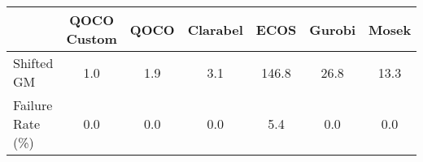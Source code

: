 \begin{tabular}{lcccccc}
  \hline
    & \textbf{QOCO Custom}   & \textbf{QOCO} & \textbf{Clarabel} & \textbf{ECOS} & \textbf{Gurobi} & \textbf{Mosek} \\ \hline
  Shifted GM & 1.0 & 1.9 & 3.1 & 146.8 & 26.8 & 13.3 \\ 
  Failure Rate (\%) & 0.0 & 0.0 & 0.0 & 5.4 & 0.0 & 0.0 \\ \hline 
\end{tabular}
